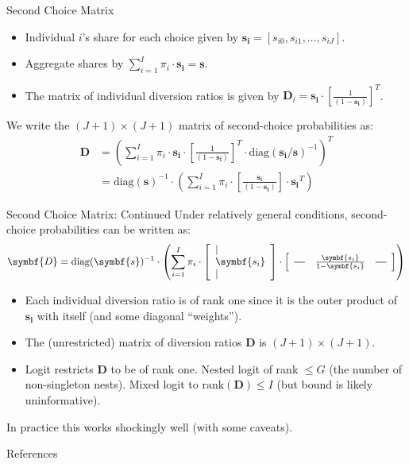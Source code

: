 \begin{frame}{Second Choice Matrix}
\begin{itemize}
\item Individual $i$'s share for each choice given by $\symbf{s_i} = [s_{i0},s_{i1},\ldots,s_{iJ}]$.
\item Aggregate shares by $\sum_{i=1}^I  \pi_i \cdot \symbf{s_i} =\symbf{s}$.
\item The matrix of individual diversion ratios is given by
$\symbf{D}_i  = \symbf{s_i}  \cdot \left[\frac{1}{(1-\symbf{s_i})} \right]^T$. 
\end{itemize}
We write the $(J+1)\times (J+1)$ matrix of second-choice probabilities as:
\begin{align*}
\nonumber \symbf{D} &=  \left(\sum_{i=1}^I \pi_i \cdot \symbf{s_i} \cdot \left[\frac{1}{(1-\symbf{s_i})} \right]^T \cdot \text{diag}(\symbf{s_i}/\symbf{s})^{-1}\right)^T \\
&=\text{diag}(\symbf{s})^{-1}  \cdot \left(\sum_{i=1}^I \pi_i \cdot  \left[\frac{\symbf{s_i}}{(1-\symbf{s_i})} \right]\cdot  \symbf{s_i}^T   \right) 
\end{align*}
\end{frame}

\begin{frame}{Second Choice Matrix: Continued}
Under relatively general conditions, second-choice probabilities can be written as:
\begin{align*}
\symbf{D}= \text{diag}(\symbf{s})^{-1}  \cdot  \left(\sum_{i=1}^I \pi_i\cdot 
\left[
\begin{array}{l}
\mid \\
\symbf{s_i} \\
\mid
\end{array}\right] \cdot \left[\begin{array}{lll}
\horzbar  &\frac{\symbf{s_i}}{1-\symbf{s_i}}  & \horzbar
\end{array}\right] \right)
\end{align*}
\begin{itemize}
    \item Each individual diversion ratio is of rank one since it is the outer product of $\symbf{s_i}$ with itself (and some diagonal ``weights'').
    \item The (unrestricted) matrix of diversion ratios $\symbf{D}$ is $(J+1)\times(J+1)$.
    \item Logit restricts $\symbf{D}$ to be of rank one. Nested logit of rank $\leq G$ (the number of non-singleton nests). Mixed logit to $\text{rank}(\symbf{D})\leq I$ (but bound is likely uninformative).
\end{itemize}
In practice this works shockingly well (with some caveats).
\end{frame}







\appendix

\begin{frame}{References}
    
\end{frame}


